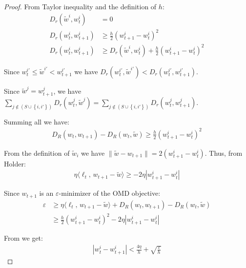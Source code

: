 \documentclass[10pt]{article}
\theoremstyle{definition}
\theoremstyle{remark}
\renewcommand{\epsilon}{\varepsilon}
\newcommand\inprod[2]{\langle #1,\,#2 \rangle}
\newcommand{\curly}[1]{ {\left\{ #1 \right\}}}
\newcommand{\abs}[1]{ {\left | #1 \right |}}
\begin{document}
\begin{proof}
From Taylor inequality and the definition of $h$:
\begin{align*}
    D_r(\tilde{w}^i, w_t^i) &= 0 \\
    D_r(w_t^i, w_{t+1}^i) &\ge \frac{h}{2}(w_{t+1}^i - w_t^i)^2  \\
    D_r(w_t^i, w_{t+1}^i) &\ge D_r(\tilde{w}^i, w_t^i) + \frac{h}{2}(w_{t+1}^i - w_t^i)^2
\end{align*}

Since $w_t^{i'} \le \tilde{w}^{i'} < w_{t+1}^{i'}$ we have $D_r(w_t^{i'}, \tilde{w}^{i'}) < D_r(w_t^{i'}, w_{t+1}^{i'})$.

Since $\tilde{w}^j = w_{t+1}^j$, we have $\sum_{j\notin (S\cup\curly{i,i'})} D_r(w_t^j,\tilde{w}^j) = \sum_{j\notin (S\cup\curly{i,i'})} D_r(w_t^j,w_{t+1}^j)$. 

Summing all we have:
\begin{align*}
    D_R(w_t, w_{t+1}) - D_R(w_t, \tilde{w}) \ge \frac{h}{2}(w_{t+1}^i - w_t^i)^2
\end{align*}

From the definition of $\tilde{w}_i$ we have $\|\tilde{w} - w_{t+1}\| = 2(w_{t+1}^i - w_t^i)$. Thus, from Holder:
\begin{align*}
    \eta\inprod{\ell_t}{w_{t+1} - \tilde{w}} \ge -2\eta\abs{w_{t+1}^i - w_t^i}
\end{align*}

Since $w_{t+1}$ is an $\epsilon$-minimizer of the OMD objective:
\begin{align*}
    \epsilon &\ge \eta\inprod{\ell_t}{w_{t+1} - \tilde{w}} + D_R(w_t, w_{t+1}) - D_R(w_t, \tilde{w})\\
   &\ge \frac{h}{2}(w_{t+1}^i - w_t^i)^2 -2\eta\abs{w_{t+1}^i - w_t^i}
\end{align*}

From  we get:
\begin{align*}
    \abs{w_t^i - w_{t+1}^i} < \frac{4\eta}{h} + \sqrt{\frac{\epsilon}{h}}
\end{align*}
\end{proof}
\end{document}
